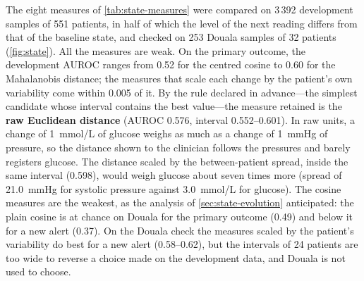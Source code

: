 \documentclass[11pt,a4paper,oneside]{report}
\begin{document}
The eight measures of \cref{tab:state-measures} were compared on 3\,392 development samples of 551 patients, in half of which the level of the next reading differs from that of the baseline state, and checked on 253 Douala samples of 32 patients (\cref{fig:state}). All the measures are weak. On the primary outcome, the development AUROC ranges from 0.52 for the centred cosine to 0.60 for the Mahalanobis distance; the measures that scale each change by the patient's own variability come within 0.005 of it. By the rule declared in advance---the simplest candidate whose interval contains the best value---the measure retained is the \textbf{raw Euclidean distance} (AUROC 0.576, interval 0.552--0.601). In raw units, a change of 1~mmol/L of glucose weighs as much as a change of 1~mmHg of pressure, so the distance shown to the clinician follows the pressures and barely registers glucose. The distance scaled by the between-patient spread, inside the same interval (0.598), would weigh glucose about seven times more (spread of 21.0~mmHg for systolic pressure against 3.0~mmol/L for glucose). The cosine measures are the weakest, as the analysis of \cref{sec:state-evolution} anticipated: the plain cosine is at chance on Douala for the primary outcome (0.49) and below it for a new alert (0.37). On the Douala check the measures scaled by the patient's variability do best for a new alert (0.58--0.62), but the intervals of 24 patients are too wide to reverse a choice made on the development data, and Douala is not used to choose.
\end{document}
